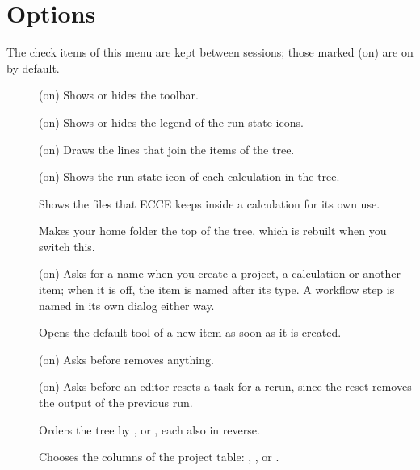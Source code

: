 \section{Options}
The check items of this menu are kept between sessions; those marked (on) are on by default.
\begin{description}
	\item[] (on) Shows or hides the toolbar.
	\item[] (on) Shows or hides the legend of the run-state icons.
	\item[] (on) Draws the lines that join the items of the tree.
	\item[] (on) Shows the run-state icon of each calculation in the tree.
	\item[] Shows the files that ECCE keeps inside a calculation for its own use.
	\item[] Makes your home folder the top of the tree, which is rebuilt when you switch this.
	\item[] (on) Asks for a name when you create a project, a calculation or another item; when it is off, the item is named after its type. A workflow step is named in its own dialog either way.
	\item[] Opens the default tool of a new item as soon as it is created.
	\item[] (on) Asks before  removes anything.
	\item[] (on) Asks before an editor resets a task for a rerun, since the reset removes the output of the previous run.
	\item[] Orders the tree by ,  or , each also in reverse.
	\item[] Chooses the columns of the project table: , ,  or .
\end{description}


